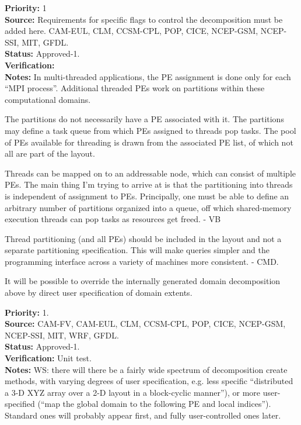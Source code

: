 \begin{reqlist}
{\bf Priority:} 1 \\ 
{\bf Source:} Requirements for specific flags to control the
  decomposition must be added here. CAM-EUL, CLM, CCSM-CPL, POP, CICE, NCEP-GSM, NCEP-SSI, MIT, GFDL. \\
{\bf Status:} Approved-1. \\
{\bf Verification:} \\
{\bf Notes:} In multi-threaded applications, the PE assignment is done
  only for each ``MPI process''. Additional threaded PEs work on
  partitions within these computational domains.
  
  The partitions do not necessarily have a PE associated with it. The
  partitions may define a task queue from which PEs assigned to
  threads pop tasks. The pool of PEs available for threading is drawn
  from the associated PE list, of which not all are part of the layout.
  
  Threads can be mapped on to an addressable node, which can 
  consist of multiple
  PEs.  The main thing I'm trying to arrive at is that the
  partitioning into threads is independent of assignment to PEs.
  Principally, one must be able to define an arbitrary number of
  partitions organized into a queue, off which shared-memory execution
  threads can pop tasks as resources get freed. - VB

  Thread partitioning (and all PEs) should be included in the layout 
  and not a separate partitioning specification.  This will make
  queries simpler and the programming interface across a variety 
  of machines more consistent. - CMD.
\end{reqlist}


It will be possible to override the internally generated 
domain decomposition above by direct user specification of domain
extents.

\begin{reqlist}
{\bf Priority:} 1. \\ 
{\bf Source:} CAM-FV, CAM-EUL, CLM, CCSM-CPL, POP, CICE, NCEP-GSM, NCEP-SSI, MIT, WRF, GFDL. \\
{\bf Status:} Approved-1. \\
{\bf Verification:} Unit test. \\
{\bf Notes:} WS:  there will there be a fairly wide spectrum 
of decomposition create methods, with varying degrees of user
specification, e.g. less specific ``distributed a 3-D XYZ array 
over a 2-D layout in a block-cyclic manner''), or more 
user-specified (``map the global domain to the following PE 
and local indices''). Standard ones will probably appear first, and
fully user-controlled ones later.
\end{reqlist}

